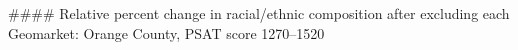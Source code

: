 #### Relative percent change in racial/ethnic composition after excluding each Geomarket: Orange County, PSAT score 1270–1520
